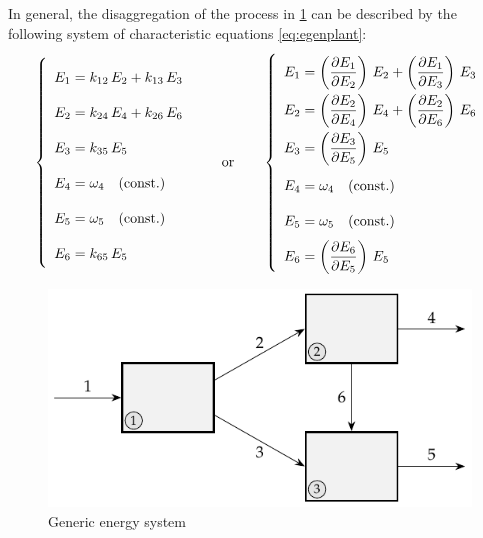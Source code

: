 \documentclass[energies,article,submit,moreauthors,pdftex]{Definitions/mdpi}
\newcommand{\dpartial}[2]{\left(\dfrac{\partial E_{#1}}{\partial E_{#2}}\right)}
\begin{document}
In general, the disaggregation of the process in \cref{fig:genplant} can be described by the following system of characteristic equations \eqref{eq:egenplant}:
\begin{equation}
    \def\arraystretch{2.1}
    \left\{\begin{array}{l}
        E_1=k_{12}\,E_2 + k_{13}\,E_3 \\
        E_2=k_{24}\,E_4 + k_{26}\,E_6 \\
        E_3=k_{35}\,E_5\\
        E_4=\omega_4 \quad \text{(const.)}\\
        E_5=\omega_5 \quad \text{(const.)}\\
        E_6=k_{65}\,E_5
    \end{array}\right.
    \qquad
    \text{or}
    \qquad
    \left\{\begin{array}{l}
        E_1=\dpartial{1}{2}\,E_2 + \dpartial{1}{3}\,E_3 \\
        E_2=\dpartial{2}{4}\,E_4 + \dpartial{2}{6}\,E_6 \\
        E_3=\dpartial{3}{5}\,E_5\\
        E_4=\omega_4 \quad \text{(const.)}\\
        E_5=\omega_5 \quad \text{(const.)}\\
        E_6=\dpartial{6}{5}\,E_5
    \end{array}\right.
    \label{eq:egenplant}
\end{equation}

\begin{figure}[ht]
    \centering
    \includegraphics{genplant}
    \caption{Generic energy system}
    \label{fig:genplant}
\end{figure}
\end{document}
